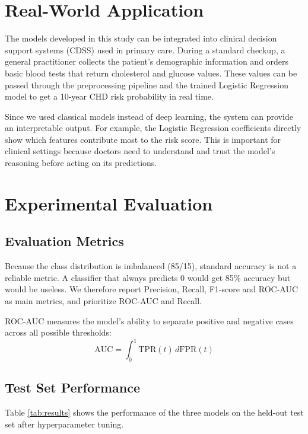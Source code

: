 \documentclass[conference]{IEEEtran}
\begin{document}
\section{Real-World Application}

The models developed in this study can be integrated into clinical decision support systems (CDSS) used in primary care. During a standard checkup, a general practitioner collects the patient's demographic information and orders basic blood tests that return cholesterol and glucose values. These values can be passed through the preprocessing pipeline and the trained Logistic Regression model to get a 10-year CHD risk probability in real time.

Since we used classical models instead of deep learning, the system can provide an interpretable output. For example, the Logistic Regression coefficients directly show which features contribute most to the risk score. This is important for clinical settings because doctors need to understand and trust the model's reasoning before acting on its predictions.

\section{Experimental Evaluation}

\subsection{Evaluation Metrics}

Because the class distribution is imbalanced (85/15), standard accuracy is not a reliable metric. A classifier that always predicts 0 would get 85\% accuracy but would be useless. We therefore report Precision, Recall, F1-score and ROC-AUC as main metrics, and prioritize ROC-AUC and Recall.

ROC-AUC measures the model's ability to separate positive and negative cases across all possible thresholds:
\begin{equation}
\text{AUC} = \int_0^1 \text{TPR}(t)\, d\text{FPR}(t)
\label{eq:auc}
\end{equation}

\subsection{Test Set Performance}

Table \ref{tab:results} shows the performance of the three models on the held-out test set after hyperparameter tuning.
\end{document}
